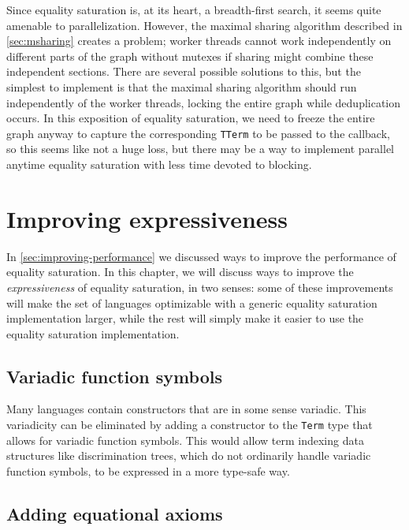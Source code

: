 \documentclass[11pt]{report}
\newcommand{\haskell}[1]{\texttt{#1}}
\begin{document}
Since equality saturation is, at its heart, a breadth-first search, it seems
quite amenable to parallelization. However, the maximal sharing algorithm
described in \autoref{sec:msharing} creates a problem; worker threads cannot
work independently on different parts of the graph without mutexes if sharing
might combine these independent sections. There are several possible solutions
to this, but the simplest to implement is that the maximal sharing algorithm
should run independently of the worker threads, locking the entire graph while
deduplication occurs. In this exposition of equality saturation, we need to
freeze the entire graph anyway to capture the corresponding \haskell{TTerm} to
be passed to the callback, so this seems like not a huge loss, but there may be
a way to implement parallel anytime equality saturation with less time devoted
to blocking.


\chapter{Improving expressiveness}
\label{sec:improving-expressiveness}

In \autoref{sec:improving-performance} we discussed ways to improve the
performance of equality saturation. In this chapter, we will discuss ways to
improve the \textit{expressiveness} of equality saturation, in two senses:
some of these improvements will make the set of languages optimizable with a
generic equality saturation implementation larger, while the rest will simply
make it easier to use the equality saturation implementation.

\section{Variadic function symbols}
\label{sec:variadic-function-symbols}

Many languages contain constructors that are in some sense variadic.
This variadicity can be eliminated by adding a constructor to the \haskell{Term}
type that allows for variadic function symbols. This would allow term indexing
data structures like discrimination trees, which do not ordinarily handle
variadic function symbols, to be expressed in a more type-safe way.

\section{Adding equational axioms}
\label{sec:equational-axioms}
\end{document}
